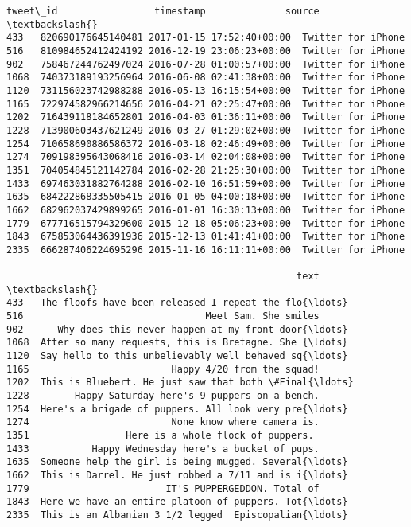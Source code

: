 \documentclass[11pt]{article}
\makeatletter
\newcommand{\boxspacing}{\kern\kvtcb@left@rule\kern\kvtcb@boxsep}
\newcommand{\prompt}[4]{
        {\ttfamily\llap{{\color{#2}[#3]:\hspace{3pt}#4}}\vspace{-\baselineskip}}
    }
\makeatother
\begin{document}
            \begin{tcolorbox}[breakable, size=fbox, boxrule=.5pt, pad at break*=1mm, opacityfill=0]
\prompt{Out}{outcolor}{51}{\boxspacing}
\begin{Verbatim}[commandchars=\\\{\}]
                tweet\_id                 timestamp              source  \textbackslash{}
433   820690176645140481 2017-01-15 17:52:40+00:00  Twitter for iPhone
516   810984652412424192 2016-12-19 23:06:23+00:00  Twitter for iPhone
902   758467244762497024 2016-07-28 01:00:57+00:00  Twitter for iPhone
1068  740373189193256964 2016-06-08 02:41:38+00:00  Twitter for iPhone
1120  731156023742988288 2016-05-13 16:15:54+00:00  Twitter for iPhone
1165  722974582966214656 2016-04-21 02:25:47+00:00  Twitter for iPhone
1202  716439118184652801 2016-04-03 01:36:11+00:00  Twitter for iPhone
1228  713900603437621249 2016-03-27 01:29:02+00:00  Twitter for iPhone
1254  710658690886586372 2016-03-18 02:46:49+00:00  Twitter for iPhone
1274  709198395643068416 2016-03-14 02:04:08+00:00  Twitter for iPhone
1351  704054845121142784 2016-02-28 21:25:30+00:00  Twitter for iPhone
1433  697463031882764288 2016-02-10 16:51:59+00:00  Twitter for iPhone
1635  684222868335505415 2016-01-05 04:00:18+00:00  Twitter for iPhone
1662  682962037429899265 2016-01-01 16:30:13+00:00  Twitter for iPhone
1779  677716515794329600 2015-12-18 05:06:23+00:00  Twitter for iPhone
1843  675853064436391936 2015-12-13 01:41:41+00:00  Twitter for iPhone
2335  666287406224695296 2015-11-16 16:11:11+00:00  Twitter for iPhone

                                                   text  \textbackslash{}
433   The floofs have been released I repeat the flo{\ldots}
516                                Meet Sam. She smiles
902      Why does this never happen at my front door{\ldots}
1068  After so many requests, this is Bretagne. She {\ldots}
1120  Say hello to this unbelievably well behaved sq{\ldots}
1165                         Happy 4/20 from the squad!
1202  This is Bluebert. He just saw that both \#Final{\ldots}
1228        Happy Saturday here's 9 puppers on a bench.
1254  Here's a brigade of puppers. All look very pre{\ldots}
1274                         None know where camera is.
1351                 Here is a whole flock of puppers.
1433           Happy Wednesday here's a bucket of pups.
1635  Someone help the girl is being mugged. Several{\ldots}
1662  This is Darrel. He just robbed a 7/11 and is i{\ldots}
1779                        IT'S PUPPERGEDDON. Total of
1843  Here we have an entire platoon of puppers. Tot{\ldots}
2335  This is an Albanian 3 1/2 legged  Episcopalian{\ldots}


\end{Verbatim}
\end{tcolorbox}
\end{document}
